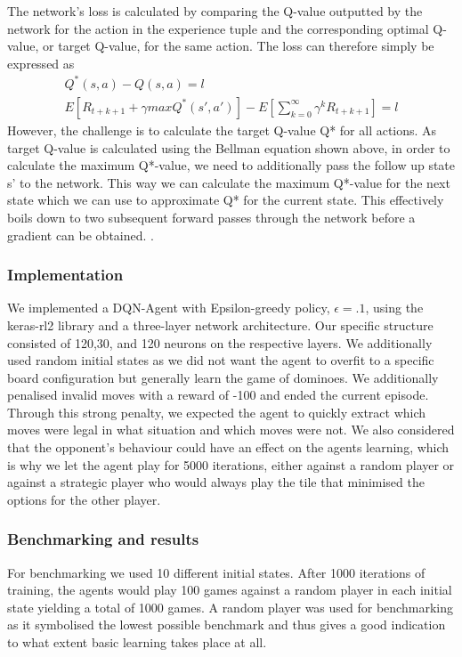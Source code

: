 \documentclass[12pt,a4paper]{article}
\begin{document}
{The network’s loss is calculated by comparing the Q-value outputted by the network for the action in the experience tuple  and the corresponding optimal Q-value, or target Q-value, for the same action. The loss can therefore simply be expressed as
$$\begin{aligned}
Q^*(s,a) - Q(s,a) = l\\
 E\left[  R_{t+k+1} +  \gamma max Q^*(s',a') \right] - E\left[  \sum_{k=0}^{\infty}  \gamma^k R_{t+k+1} \right] = l
 \end{aligned}$$
However, the challenge is to calculate the target Q-value Q* for all actions. As target Q-value is calculated using the Bellman equation shown above, in order to calculate the maximum Q*-value, we need to additionally pass the follow up state s’ to the network. This way we can calculate the maximum Q*-value for the next state which we can use to approximate Q* for the current state. This effectively boils down to two subsequent forward passes through the network before a gradient can be obtained. 
 \citep{russell_artificial_2010}.


\subsubsection{Implementation}
We implemented a DQN-Agent with Epsilon-greedy policy, $\epsilon = .1$, using the keras-rl2 library and a three-layer network architecture. Our specific structure consisted of 120,30, and 120 neurons on the respective layers. We additionally used random initial states as we did not want the agent to overfit to a specific board configuration but generally learn the game of dominoes. We additionally penalised invalid moves with a reward of -100 and ended the current episode. Through this strong penalty, we expected the agent to quickly extract which moves were legal in what situation and which moves were not. We also considered that the opponent’s behaviour could have an effect on the agents learning, which is why we let the agent play for 5000 iterations, either against a random player or against a strategic player who would always play the tile that minimised the options for the other player.

\subsubsection{Benchmarking and results}
For benchmarking we used 10 different initial states. After 1000 iterations of training, the agents would play 100 games against a random player in each initial state yielding a total of 1000 games. A random player was used for benchmarking as it symbolised the lowest possible benchmark and thus gives a good indication to what extent basic learning takes place at all.

}
\end{document}
